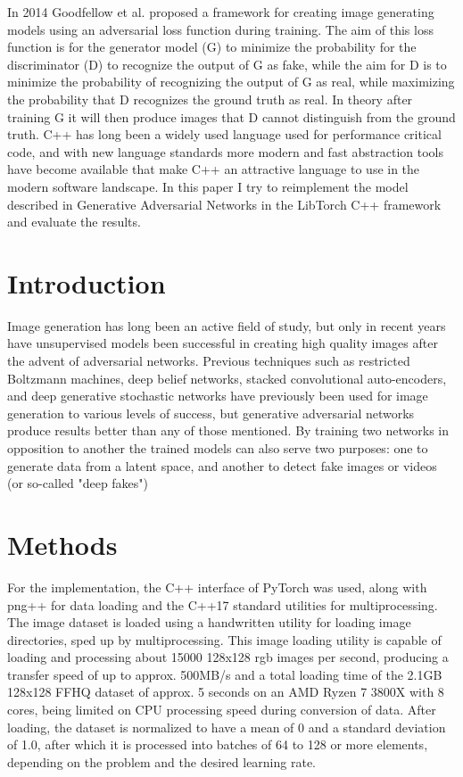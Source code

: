 
In 2014 Goodfellow et al. proposed a framework for creating image generating models
using an adversarial loss function during training.
The aim of this loss function is for the generator model (G) to minimize the probability
for the discriminator (D) to recognize the output of G as fake, while the aim for D
is to minimize the probability of recognizing the output of G as real, while maximizing the
probability that D recognizes the ground truth as real.
In theory after training G it will then produce images that D cannot distinguish from the ground
truth.
C++ has long been a widely used language used for performance critical code, and with new
language standards more modern and fast abstraction tools have become available that make C++ an
attractive language to use in the modern software landscape.
In this paper I try to reimplement the model described in Generative Adversarial Networks in the
LibTorch C++ framework and evaluate the results.

\section{Introduction}\label{sec:introduction}
Image generation has long been an active field of study, but only in recent years have unsupervised
models been successful in creating high quality images after the advent of adversarial networks.
Previous techniques such as restricted Boltzmann machines, deep belief networks, stacked
convolutional auto-encoders, and deep generative stochastic networks have previously been used
for image generation to various levels of success, but generative adversarial networks produce
results better than any of those mentioned.
By training two networks in opposition to another the trained models can also serve two purposes:
one to generate data from a latent space, and another to detect fake images or videos (or so-called
"deep fakes")

\section{Methods}\label{sec:methods}
For the implementation, the C++ interface of PyTorch was used, along with png++ for data loading
and the C++17 standard utilities for multiprocessing.
The image dataset is loaded using a handwritten utility for loading image directories, sped up by
multiprocessing.
This image loading utility is capable of loading and processing about 15000 128x128 rgb images
per second, producing a transfer speed of up to approx. 500MB/s and a total loading time of the
2.1GB 128x128 FFHQ dataset of approx. 5 seconds on an AMD Ryzen 7 3800X with 8 cores, being
limited on CPU processing speed during conversion of data.
After loading, the dataset is normalized to have a mean of 0 and a standard deviation of 1.0, after
which it is processed into batches of 64 to 128 or more elements, depending on the problem and
the desired learning rate.

